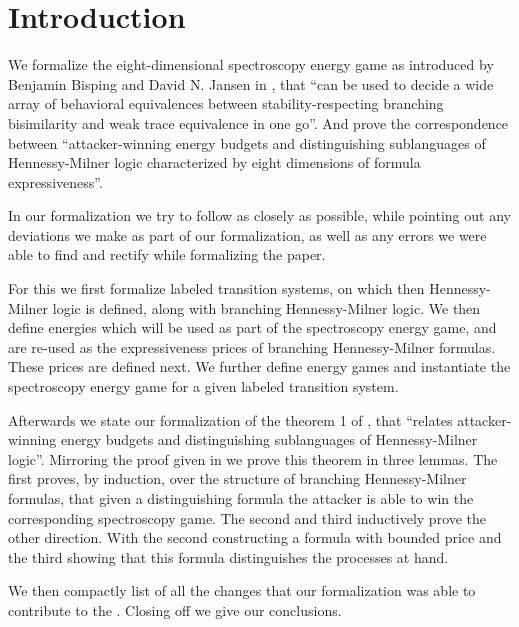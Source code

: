 \newpage
\section{Introduction}
We formalize the eight-dimensional spectroscopy energy game as introduced by Benjamin Bisping and David N. Jansen in \cite{bisping2023lineartimebranchingtime}, that ``can be used to decide a wide array of behavioral equivalences between stability-respecting branching bisimilarity and weak trace equivalence in one go''\cite{bisping2023lineartimebranchingtime}. And prove the correspondence between ``attacker-winning energy budgets and distinguishing sublanguages of Hennessy-Milner logic characterized by eight dimensions of formula expressiveness''.

In our formalization we try to follow \cite{bisping2023lineartimebranchingtime} as closely as possible, while pointing out any deviations we make as part of our formalization, as well as any errors we were able to find and rectify while formalizing the paper.

For this we first formalize labeled transition systems, on which then Hennessy-Milner logic is defined, along with branching Hennessy-Milner logic.
We then define energies which will be used as part of the spectroscopy energy game, and are re-used as the expressiveness prices of branching Hennessy-Milner formulas. These prices are defined next.
We further define energy games and instantiate the spectroscopy energy game for a given labeled transition system.

Afterwards we state our formalization of the theorem 1 of \cite{bisping2023lineartimebranchingtime}, that ``relates attacker-winning energy budgets and distinguishing sublanguages of Hennessy-Milner logic''. Mirroring the proof given in \cite{bisping2023lineartimebranchingtime} we prove this theorem in three lemmas. The first proves, by induction, over the structure of branching Hennessy-Milner formulas, that given a distinguishing formula the attacker is able to win the corresponding spectroscopy game. The second and third inductively prove the other direction. With the second constructing a formula with bounded price and the third showing that this formula distinguishes the processes at hand. %

We then compactly list of all the changes that our formalization was able to contribute to the \cite{bisping2023lineartimebranchingtime}.
Closing off we give our conclusions. %